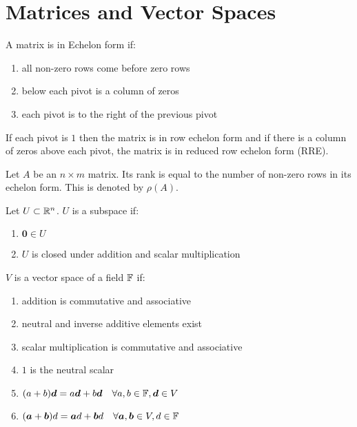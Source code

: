 \documentclass[a4paper,10pt]{article}
\begin{document}
\section{Matrices and Vector Spaces}

\begin{defn}
	A matrix is in Echelon form if:
	\begin{enumerate}
		\item all non-zero rows come before zero rows
		\item below each pivot is a column of zeros
		\item each pivot is to the right of the previous pivot
	\end{enumerate}

	If each pivot is $1$ then the matrix is in row echelon form and if
	there is a column of zeros above each pivot, the matrix is in reduced
	row echelon form (RRE).
\end{defn}

\begin{defn}[Rank]
	Let $A$ be an $n \times m$ matrix. Its rank is equal to the number of
	non-zero rows in its echelon form. This is denoted by $\rho(A)$.
\end{defn}

\begin{defn}[Subspace]
	Let $U \subset \mathbb{R}^n$. $U$ is a subspace if:
	\begin{enumerate}
		\item $\bm{0} \in U$
		\item $U$ is closed under addition and scalar multiplication
	\end{enumerate}
\end{defn}

\begin{defn}
	$V$ is a vector space of a field $\mathbb{F}$ if:
	\begin{enumerate}
		\item addition is commutative and associative
		\item neutral and inverse additive elements exist
		\item scalar multiplication is commutative and associative
		\item $1$ is the neutral scalar
		\item $(a+b)\bm{d} = a\bm{d} + b\bm{d} \quad \forall a,b \in \mathbb{F}, \bm{d} \in V$
		\item $(\bm{a} + \bm{b})d = \bm{a}d + \bm{b}d \quad \forall \bm{a},\bm{b} \in V, d \in \mathbb{F}$
	\end{enumerate}
\end{defn}
\end{document}
